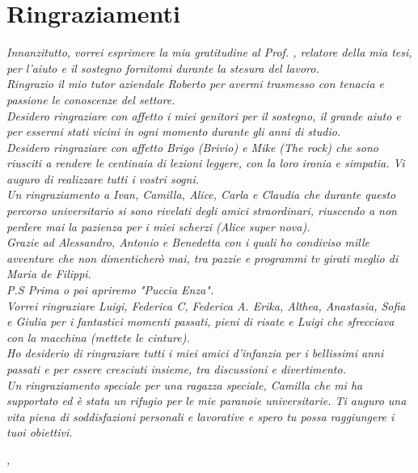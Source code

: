 \cleardoublepage
{}
{}

\begingroup
\let\clearpage\relax
\let\cleardoublepage\relax
\let\cleardoublepage\relax

\chapter*{Ringraziamenti}

\noindent \textit{Innanzitutto, vorrei esprimere la mia gratitudine al Prof. \myProf, relatore della mia tesi, per l'aiuto e il sostegno fornitomi durante la stesura del lavoro.}\\

\noindent \textit{Ringrazio il mio tutor aziendale Roberto per avermi trasmesso con tenacia e passione le conoscenze del settore.}\\

\noindent \textit{Desidero ringraziare con affetto i miei genitori per il sostegno, il grande aiuto e per essermi stati vicini in ogni momento durante gli anni di studio.}\\

\noindent \textit{Desidero ringraziare con affetto Brigo (Brivio) e Mike (The rock) che sono riusciti a rendere le centinaia di lezioni leggere, con la loro ironia e simpatia. Vi auguro di realizzare tutti i vostri sogni.}\\

\noindent \textit{Un ringraziamento a Ivan, Camilla, Alice, Carla e Claudia che durante questo percorso universitario si sono rivelati degli amici straordinari, riuscendo a non perdere mai la pazienza per i miei scherzi (Alice super nova).}\\

\noindent \textit{Grazie ad Alessandro, Antonio e Benedetta con i quali ho condiviso mille avventure che non dimenticherò mai, tra pazzie e programmi tv girati meglio di Maria de Filippi.\\
P.S Prima o poi apriremo "Puccia Enza". }\\

\noindent \textit{Vorrei ringraziare Luigi, Federica C, Federica A. Erika, Althea, Anastasia, Sofia e Giulia per i fantastici momenti passati, pieni di risate e Luigi che sfrecciava con la macchina (mettete le cinture). }\\

\noindent \textit{Ho desiderio di ringraziare tutti i miei amici d'infanzia per i bellissimi anni passati e per essere cresciuti insieme, tra discussioni e divertimento.}\\

\noindent \textit{Un ringraziamento speciale per una ragazza speciale, Camilla che mi ha supportato ed è stata un rifugio per le mie paranoie universitarie. Ti auguro una vita piena di soddisfazioni personali e lavorative e spero tu possa raggiungere i tuoi obiettivi.}\\
\bigskip

\noindent\textit{\myLocation, \myTime}
\hfill \myName

\endgroup
